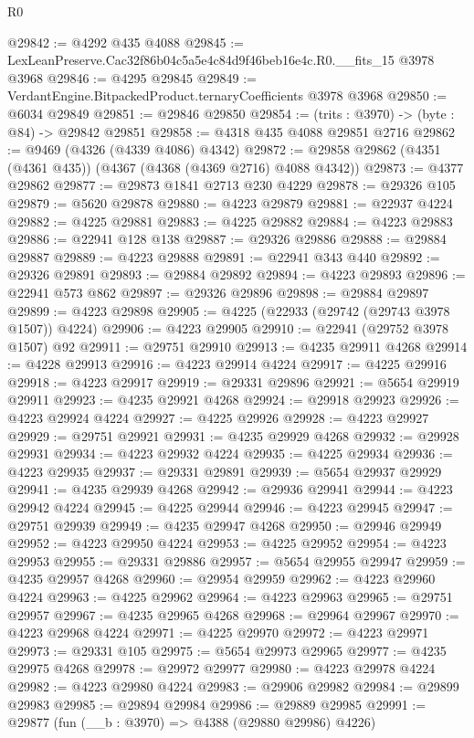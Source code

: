 \begin{lexlean}{R0}
\begin{coremodule}
@29842 := @4292 @435 @4088
@29845 := LexLeanPreserve.Cac32f86b04c5a5e4c84d9f46beb16e4c.R0.__fits_15 @3978 @3968
@29846 := @4295 @29845
@29849 := VerdantEngine.BitpackedProduct.ternaryCoefficients @3978 @3968
@29850 := @6034 @29849
@29851 := @29846 @29850
@29854 := (trits : @3970) -> (byte : @84) -> @29842 @29851
@29858 := @4318 @435 @4088 @29851 @2716
@29862 := @9469 (@4326 (@4339 @4086) @4342)
@29872 := @29858 @29862 (@4351 (@4361 @435)) (@4367 (@4368 (@4369 @2716) @4088 @4342))
@29873 := @4377 @29862
@29877 := @29873 @1841 @2713 @230 @4229
@29878 := @29326 @105
@29879 := @5620 @29878
@29880 := @4223 @29879
@29881 := @22937 @4224
@29882 := @4225 @29881
@29883 := @4225 @29882
@29884 := @4223 @29883
@29886 := @22941 @128 @138
@29887 := @29326 @29886
@29888 := @29884 @29887
@29889 := @4223 @29888
@29891 := @22941 @343 @440
@29892 := @29326 @29891
@29893 := @29884 @29892
@29894 := @4223 @29893
@29896 := @22941 @573 @862
@29897 := @29326 @29896
@29898 := @29884 @29897
@29899 := @4223 @29898
@29905 := @4225 (@22933 (@29742 (@29743 @3978 @1507)) @4224)
@29906 := @4223 @29905
@29910 := @22941 (@29752 @3978 @1507) @92
@29911 := @29751 @29910
@29913 := @4235 @29911 @4268
@29914 := @4228 @29913
@29916 := @4223 @29914 @4224
@29917 := @4225 @29916
@29918 := @4223 @29917
@29919 := @29331 @29896
@29921 := @5654 @29919 @29911
@29923 := @4235 @29921 @4268
@29924 := @29918 @29923
@29926 := @4223 @29924 @4224
@29927 := @4225 @29926
@29928 := @4223 @29927
@29929 := @29751 @29921
@29931 := @4235 @29929 @4268
@29932 := @29928 @29931
@29934 := @4223 @29932 @4224
@29935 := @4225 @29934
@29936 := @4223 @29935
@29937 := @29331 @29891
@29939 := @5654 @29937 @29929
@29941 := @4235 @29939 @4268
@29942 := @29936 @29941
@29944 := @4223 @29942 @4224
@29945 := @4225 @29944
@29946 := @4223 @29945
@29947 := @29751 @29939
@29949 := @4235 @29947 @4268
@29950 := @29946 @29949
@29952 := @4223 @29950 @4224
@29953 := @4225 @29952
@29954 := @4223 @29953
@29955 := @29331 @29886
@29957 := @5654 @29955 @29947
@29959 := @4235 @29957 @4268
@29960 := @29954 @29959
@29962 := @4223 @29960 @4224
@29963 := @4225 @29962
@29964 := @4223 @29963
@29965 := @29751 @29957
@29967 := @4235 @29965 @4268
@29968 := @29964 @29967
@29970 := @4223 @29968 @4224
@29971 := @4225 @29970
@29972 := @4223 @29971
@29973 := @29331 @105
@29975 := @5654 @29973 @29965
@29977 := @4235 @29975 @4268
@29978 := @29972 @29977
@29980 := @4223 @29978 @4224
@29982 := @4223 @29980 @4224
@29983 := @29906 @29982
@29984 := @29899 @29983
@29985 := @29894 @29984
@29986 := @29889 @29985
@29991 := @29877 (fun (__b : @3970) => @4388 (@29880 @29986) @4226)

\end{coremodule}
\end{lexlean}
